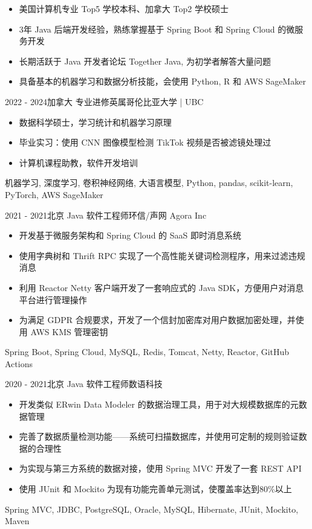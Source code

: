 \documentclass[alternative]{resume_template}
\begin{document}
\makecvheader

\begin{itemize}
    \item 美国计算机专业 Top5 学校本科、加拿大 Top2 学校硕士  
    \item 3年 Java 后端开发经验，熟练掌握基于 Spring Boot 和 Spring Cloud 的微服务开发
    \item 长期活跃于 Java 开发者论坛 Together Java, 为初学者解答大量问题
    \item 具备基本的机器学习和数据分析技能，会使用 Python, R 和 AWS SageMaker
\end{itemize}

\begin{experiences}

    \experience
    {2022 - 2024}{加拿大}
    {专业进修}{英属哥伦比亚大学 | UBC}
    {
        \begin{itemize}
            \item 数据科学硕士，学习统计和机器学习原理
            \item 毕业实习：使用 CNN 图像模型检测 TikTok 视频是否被滤镜处理过
            \item 计算机课程助教，软件开发培训
        \end{itemize}
    }
    {机器学习, 深度学习, 卷积神经网络, 大语言模型, Python, pandas, scikit-learn, PyTorch, AWS SageMaker}

    \experience
    {2021 - 2021}{北京}
    {Java 软件工程师}{环信/声网 Agora Inc}
    {
        \begin{itemize}
            \item 开发基于微服务架构和 Spring Cloud 的 SaaS 即时消息系统
            \item 使用字典树和 Thrift RPC 实现了一个高性能关键词检测程序，用来过滤违规消息
            \item 利用 Reactor Netty 客户端开发了一套响应式的 Java SDK，方便用户对消息平台进行管理操作
            \item 为满足 GDPR 合规要求，开发了一个信封加密库对用户数据加密处理，并使用 AWS KMS 管理密钥
        \end{itemize}
    }
    {Spring Boot, Spring Cloud, MySQL, Redis, Tomcat, Netty, Reactor, GitHub Actions}

    \experience
    {2020 - 2021}{北京}
    {Java 软件工程师}{数语科技}
    {
        \begin{itemize}
            \item 开发类似 ERwin Data Modeler 的数据治理工具，用于对大规模数据库的元数据管理
            \item 完善了数据质量检测功能——系统可扫描数据库，并使用可定制的规则验证数据的合理性
            \item 为实现与第三方系统的数据对接，使用 Spring MVC 开发了一套 REST API
            \item 使用 JUnit 和 Mockito 为现有功能完善单元测试，使覆盖率达到80\%以上
        \end{itemize}
    }
    {Spring MVC, JDBC, PostgreSQL, Oracle, MySQL, Hibernate, JUnit, Mockito, Maven}


\end{experiences}
\end{document}
